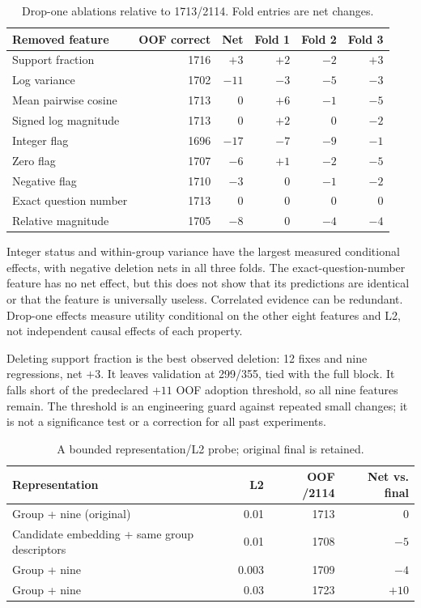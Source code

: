 \documentclass[11pt,a4paper]{article}
\begin{document}
\begin{table}[h]\centering\small
\caption{Drop-one ablations relative to 1713/2114. Fold entries are net changes.}
\begin{tabular}{lrrrrr}\toprule
Removed feature & OOF correct & Net & Fold 1 & Fold 2 & Fold 3 \\\midrule
Support fraction & 1716 & $+3$ & $+2$ & $-2$ & $+3$ \\
Log variance & 1702 & $-11$ & $-3$ & $-5$ & $-3$ \\
Mean pairwise cosine & 1713 & $0$ & $+6$ & $-1$ & $-5$ \\
Signed log magnitude & 1713 & $0$ & $+2$ & $0$ & $-2$ \\
Integer flag & 1696 & $-17$ & $-7$ & $-9$ & $-1$ \\
Zero flag & 1707 & $-6$ & $+1$ & $-2$ & $-5$ \\
Negative flag & 1710 & $-3$ & $0$ & $-1$ & $-2$ \\
Exact question number & 1713 & $0$ & $0$ & $0$ & $0$ \\
Relative magnitude & 1705 & $-8$ & $0$ & $-4$ & $-4$ \\
\bottomrule\end{tabular}
\end{table}

Integer status and within-group variance have the largest measured conditional
effects, with negative deletion nets in all three folds. The exact-question-number
feature has no net effect, but this does not show that its predictions are
identical or that the feature is universally useless. Correlated evidence can
be redundant. Drop-one effects measure utility conditional on the other eight
features and L2, not independent causal effects of each property.

Deleting support fraction is the best observed deletion: 12 fixes and nine
regressions, net $+3$. It leaves validation at 299/355, tied with the full block.
It falls short of the predeclared $+11$ OOF adoption threshold, so all nine
features remain. The threshold is an engineering guard against repeated small
changes; it is not a significance test or a correction for all past experiments.

\begin{table}[h]\centering
\caption{A bounded representation/L2 probe; original final is retained.}
\begin{tabular}{lrrr}\toprule
Representation & L2 & OOF /2114 & Net vs. final \\\midrule
Group + nine (original) & 0.01 & 1713 & $0$ \\
Candidate embedding + same group descriptors & 0.01 & 1708 & $-5$ \\
Group + nine & 0.003 & 1709 & $-4$ \\
Group + nine & 0.03 & 1723 & $+10$ \\
\bottomrule\end{tabular}
\end{table}
\end{document}

